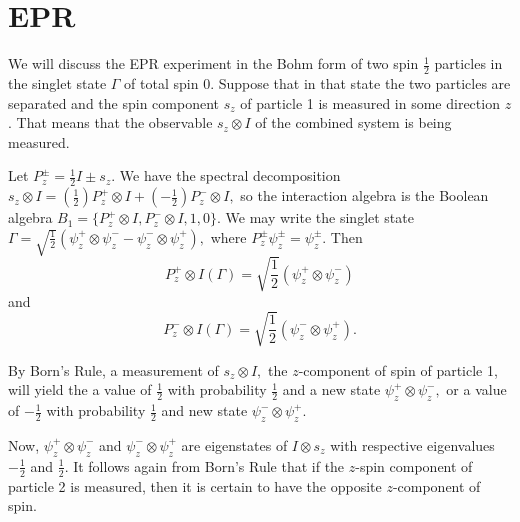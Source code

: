 \documentclass[12pt]{article}
\begin{document}
\section{EPR}
We will discuss the EPR experiment in the Bohm form of two spin $\frac{1}{2}$ particles in the singlet state $\Gamma$ of total spin 0. Suppose that in that state the two particles are separated and the spin component $s_z$ of particle 1 is measured in some direction $z$. That means that the observable $s_z\otimes I$ of the combined system is being measured. 

 Let $P_z^\pm  = \frac{1}{2} I \pm s_z.$ We have the spectral decomposition $s_z\otimes I = (\frac{1}{2})P^+_z\otimes I + (-\frac{1}{2})P_z^-\otimes I,$                                                                                                                                                                                            so the interaction algebra is the Boolean algebra $B_1 = \{ P_z^+\otimes I, P_z^-\otimes I,1,0\}.$                                                                                                                                                                                                                               We may write the singlet state $\Gamma = \sqrt{\frac{1}{2}}(\psi^+_z\otimes \psi^-_z - \psi_z^- \otimes \psi_z^+),$ where $P_z^\pm \psi_z^\pm = \psi_z^\pm$. Then  
$$
P_z^+\otimes I(\Gamma) = \sqrt{\frac{1}{2}} (\psi_z^+\otimes \psi_z^-)
$$
and
$$                                                                                                                                                                                                                                                                                                                       P_z^-\otimes I(\Gamma) = \sqrt{\frac{1}{2}} (\psi_z^- \otimes \psi_z^+).
$$

By Born's Rule, a measurement of $s_z\otimes I,$ the $z$-component of spin of particle 1, will yield the a value of $\frac{1}{2}$ with probability $\frac{1}{2}$ and a new state $\psi_z^+\otimes \psi_z^-,$ or a value of  $-\frac{1}{2}$ with probability $\frac{1}{2}$  and new state  $\psi_z^-\otimes \psi_z^+.$

                                                                                                                                                                                                  Now,  $\psi_z^+\otimes \psi_z^-$ and $\psi_z^-\otimes \psi_z^+$ are eigenstates of $I\otimes s_z$ with respective eigenvalues  $-\frac{1}{2}$ and $\frac{1}{2}$. It follows again from Born's Rule that if the $z$-spin component of particle 2 is measured, then it is certain to have the opposite $z$-component of spin.     
                                                                                                                                                                                       
\end{document}
